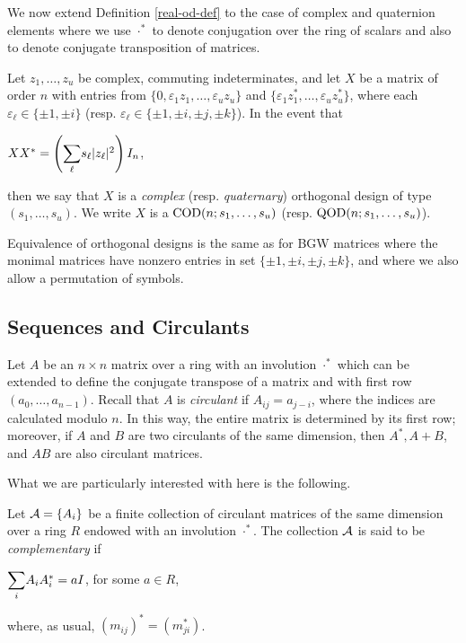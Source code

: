 \documentclass[../../../main]{subfiles}
\begin{document}
We now extend Definition \ref{real-od-def} to the case of complex and quaternion
elements where we use $\cdot^*$ to denote conjugation over the ring of scalars
and also to denote conjugate transposition of matrices.


\begin{defin}
  Let $z_1, \dots, z_u$ be complex, commuting indeterminates, and let $X$ be a matrix of order $n$ with entries from $\{0,\varepsilon_1z_1, \dots, \varepsilon_uz_u\}$ and $\{\varepsilon_1z_1^*, \dots, \varepsilon_uz_u^*\}$, where each $\varepsilon_\ell \in \{\pm 1, \pm i\}$ (resp. $\varepsilon_\ell \in \{\pm 1, \pm i, \pm j, \pm k\}$). In the event that
  \begin{defenum}
  \item\label{qod-od-def} $XX^* = \left( \ssum_\ell s_\ell|z_\ell|^2 \right)I_n$,
  \end{defenum}
  then we say that $X$ is a {\it complex} (resp. {\it quaternary}) orthogonal design of type $(s_1,\dots,s_u)$. We write $X$ is a $\text{COD}(n;s_1,\dots,s_u)$ (resp. $\text{QOD}(n;s_1,\dots,s_u)$).
\end{defin}

Equivalence of orthogonal designs is the same as for BGW matrices where the
monimal matrices have nonzero entries in set $\{\pm 1,\pm i,\pm j,\pm k\}$, and where we also
allow a permutation of symbols.

\dinkus


\subsection{Sequences and Circulants}

 Let $A$ be an $n \times n$ matrix over a ring with an involution $\cdot^*$
 which can be extended to define the conjugate transpose of a matrix and with
 first row $(a_0,\dots,a_{n-1})$. Recall 
 that $A$ is {\it circulant} if $A_{ij}=a_{j-i}$, where
 the indices are calculated modulo $n$. In this way, the entire matrix is
 determined by its first row; moreover, if $A$ and $B$ are two circulants of the
 same dimension, then $A^*,A+B$, and $AB$ are also circulant matrices. 

 What we are particularly interested with here is the following.
 
 \begin{defin}
  Let $\mathcal{A}=\{A_i\}$ be a finite collection of circulant matrices of the same
  dimension over a ring $R$ endowed with an involution $\cdot^*$.
  The collection $\mathcal{A}$ is said to be {\it complementary} if 
  \begin{defenum}
   \item $\ssum_i A_iA_i^* = aI$, for some $a \in R$,
  \end{defenum}
  where, as usual, $(m_{ij})^*=(m_{ji}^*)$.
 \end{defin}
 
\end{document}
